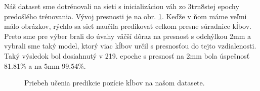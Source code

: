Náš dataset sme dotrénovali na sieti s inicializáciou váh zo 3trn8stej epochy predošlého trénovania. Vývoj presnosti je na obr. \ref{img:53myAcc}. Keďže v ňom máme veľmi málo obrázkov, rýchlo sa sieť naučila predikovať celkom presne súradnice kĺbov. Preto sme pre výber brali do úvahy väčší dôraz na presnosť s odchýlkou 2mm a vybrali sme taký model, ktorý viac kĺbov určil s presnosťou do tejto vzdialenosti. Taký výsledok bol dosiahnutý v 219. epoche s presnosť na 2mm bola úspešnosť 81.81\% a na 5mm 99.54\%.

\begin{figure}[H]
	\begin{center}
		\caption{Priebeh učenia predikcie pozície kĺbov na našom datasete.}
		\label{img:53myAcc}
	\end{center}
\end{figure}